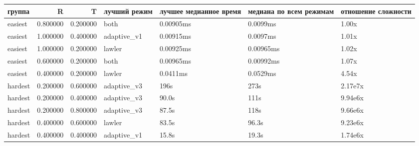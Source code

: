 \begin{tabular}{lrrllll}
\toprule
группа & R & T & лучший режим & лучшее медианное время & медиана по всем режимам & отношение сложности \\
\midrule
easiest & 0.800000 & 0.200000 & both & 0.00905ms & 0.0099ms & 1.00x \\
easiest & 1.000000 & 0.400000 & adaptive\_v1 & 0.00915ms & 0.0097ms & 1.01x \\
easiest & 1.000000 & 0.200000 & lawler & 0.00925ms & 0.00965ms & 1.02x \\
easiest & 0.600000 & 0.200000 & both & 0.00965ms & 0.00992ms & 1.07x \\
easiest & 0.400000 & 0.200000 & lawler & 0.0411ms & 0.0529ms & 4.54x \\
hardest & 0.200000 & 0.600000 & adaptive\_v3 & 196s & 273s & 2.17e7x \\
hardest & 0.200000 & 0.400000 & adaptive\_v3 & 90.0s & 111s & 9.94e6x \\
hardest & 0.200000 & 0.800000 & adaptive\_v3 & 87.5s & 118s & 9.66e6x \\
hardest & 0.400000 & 0.600000 & lawler & 83.5s & 96.3s & 9.23e6x \\
hardest & 0.400000 & 0.400000 & adaptive\_v1 & 15.8s & 19.3s & 1.74e6x \\
\bottomrule
\end{tabular}
